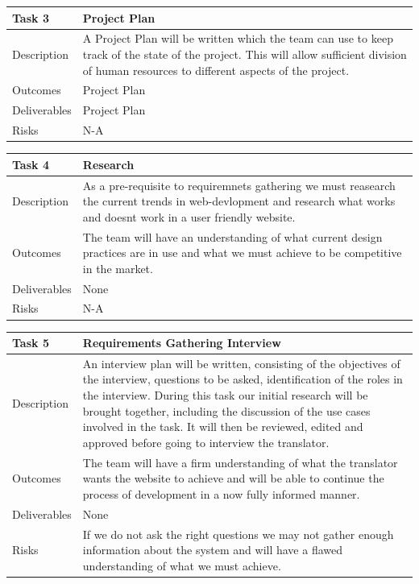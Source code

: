 \documentclass{l3proj}
\begin{document}
\begin{center}
    \begin{tabular}{ | l | p{12cm} |}
    \hline	
    Task 3 & Project Plan \\ \hline
    Description & A Project Plan will be written which the team can use to keep track of the state of the project. This will allow sufficient division of human resources to different aspects of the project. \\ \hline   
    Outcomes & Project Plan \\ \hline
    Deliverables & Project Plan \\ \hline
    Risks & N-A \\ 
    \hline
    \end{tabular}
\end{center}

\begin{center}
    \begin{tabular}{ | l | p{12cm} |}
    \hline	
    Task 4 & Research \\ \hline
    Description & As a pre-requisite to requiremnets gathering we must reasearch the current trends in web-devlopment and research what works and doesnt work in a user friendly website. \\ \hline   
    Outcomes & The team will have an understanding of what current design practices are in use and what we must achieve to be competitive in the market. \\ \hline
    Deliverables & None \\ \hline
    Risks & N-A \\ 
    \hline
    \end{tabular}
\end{center}

\begin{center}
    \begin{tabular}{ | l | p{12cm} |}
    \hline	
    Task 5 & Requirements Gathering Interview \\ \hline
    Description & An interview plan will be written, consisting
          of the objectives of the interview, questions to be asked,
          identification of the roles in the interview. During this task our initial research will be brought together, including the discussion of the use cases involved in the task. It will then be
          reviewed, edited and approved before going to interview the translator. \\ \hline   
    Outcomes & The team will have a firm understanding of what the translator wants the website to achieve and will be able to continue the process of development in a now fully informed manner. \\ \hline
    Deliverables & None \\ \hline
    Risks & If we do not ask the right questions we may not gather enough information about the system and will have a flawed understanding of what we must achieve. \\ 
    \hline
    \end{tabular}
\end{center}
\end{document}
